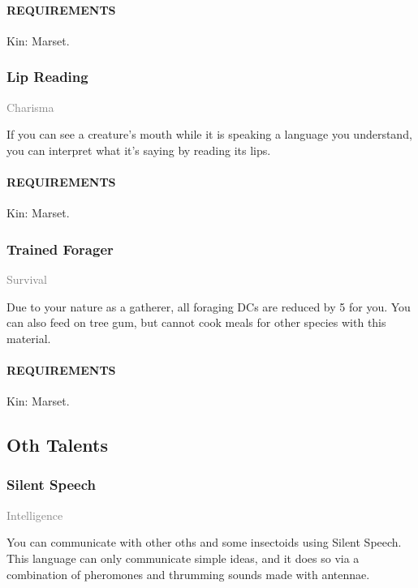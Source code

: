     \paragraph{REQUIREMENTS} Kin: Marset.

    \subsubsection{Lip Reading} \label{tal::lipreading}
    \small{\textcolor{gray}{Charisma}}

    \normalsize
    If you can see a creature's mouth while it is speaking a language you understand, you can interpret what it's saying by reading its lips.
    \paragraph{REQUIREMENTS} Kin: Marset.

    \subsubsection{Trained Forager} \label{tal::trainedforager}
    \small{\textcolor{gray}{Survival}}

    \normalsize
    Due to your nature as a gatherer, all foraging DCs are reduced by 5 for you.
    You can also feed on tree gum, but cannot cook meals for other species with this material.
    \paragraph{REQUIREMENTS} Kin: Marset.

\subsection*{Oth Talents}
    \subsubsection{Silent Speech} \label{tal::silentspeech}
    \small{\textcolor{gray}{Intelligence}}

    \normalsize
    You can communicate with other oths and some insectoids using Silent Speech.
    This language can only communicate simple ideas, and it does so via a combination of pheromones and thrumming sounds made with antennae.
